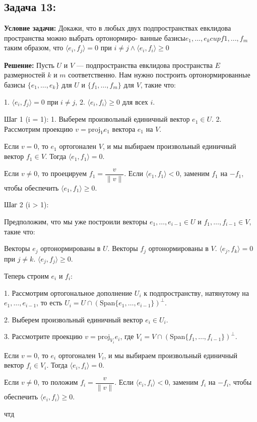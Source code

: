 \documentclass[a4paper,12pt]{article}
\begin{document}
\subsection{Задача 13: }
\textbf{ Условие задачи: }
Докажи, что в любых двух подпространствах евклидова пространства можно выбрать ортонормиро- ванные базисы$ e_{1} ,...,e_k cup f 1 ,...,f_m$ таким образом, что $\langle e_{i}, f_{j}\rangle = 0$ при $i \ne j \land \langle e_{i}, f_{i}\rangle \ge 0 $

\textbf{Решение: }
Пусть $ U $ и $ V $ — подпространства евклидова пространства $ E $ размерностей $ k $ и $ m $ соответственно. Нам нужно построить ортонормированные базисы $ \{e_1, \ldots, e_k\} $ для $ U $ и $ \{f_1, \ldots, f_m\} $ для $ V $, такие что:

1. $ \langle e_i, f_j \rangle = 0 $ при $ i \ne j $,
2. $ \langle e_i, f_i \rangle \geq 0 $ для всех $ i $.

Шаг 1 (i = 1):
1. Выберем произвольный единичный вектор $ e_1 \in U $.
2. Рассмотрим проекцию $ v = \text{proj}_V e_1 $ вектора $ e_1 $ на $ V $.

Если $ v = 0 $, то $ e_1 $ ортогонален $ V $, и мы выбираем произвольный единичный вектор $ f_1 \in V $. Тогда $ \langle e_1, f_1 \rangle = 0 $.

Если $ v \ne 0 $, то проецируем $ f_1 = \dfrac{v}{\|v\|} $. Если $ \langle e_1, f_1 \rangle < 0 $, заменим $ f_1 $ на $ -f_1 $, чтобы обеспечить $ \langle e_1, f_1 \rangle \geq 0 $.

Шаг 2 (i > 1):

Предположим, что мы уже построили векторы $ e_1, \ldots, e_{i-1} \in U $ и $ f_1, \ldots, f_{i-1} \in V $, такие что:

Векторы $ e_j $ ортонормированы в $ U $.
Векторы $ f_j $ ортонормированы в $ V $.
$ \langle e_j, f_k \rangle = 0 $ при $ j \ne k $.
$ \langle e_j, f_j \rangle \geq 0 $.

Теперь строим $ e_i $ и $ f_i $:

1. Рассмотрим ортогональное дополнение $ U_i $ к подпространству, натянутому на $ e_1, \ldots, e_{i-1} $, то есть $ U_i = U \cap \left( \text{Span}\{e_1, \ldots, e_{i-1}\} \right)^\perp $.

2. Выберем произвольный единичный вектор $ e_i \in U_i $.

3. Рассмотрите проекцию $ v = \text{proj}_{V_i} e_i $, где $ V_i = V \cap \left( \text{Span}\{f_1, \ldots, f_{i-1}\} \right)^\perp $.

Если $ v = 0 $, то $ e_i $ ортогонален $ V_i $, и мы выбираем произвольный единичный вектор $ f_i \in V_i $. Тогда $ \langle e_i, f_i \rangle = 0 $.

Если $ v \ne 0 $, то положим $ f_i = \dfrac{v}{\|v\|} $. Если $ \langle e_i, f_i \rangle < 0 $, заменим $ f_i $ на $ -f_i $, чтобы обеспечить $ \langle e_i, f_i \rangle \geq 0 $.


чтд
\end{document}
